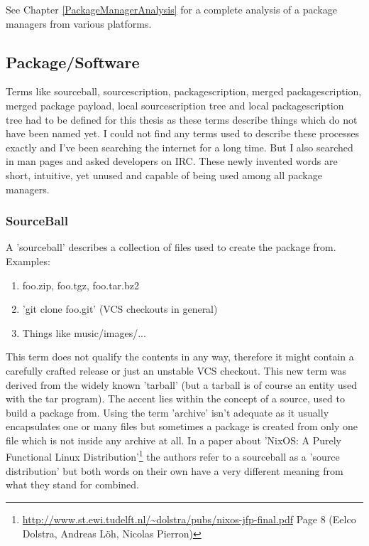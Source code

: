 \documentclass[a4paper,10pt]{article}
\begin{document}
See Chapter \ref{PackageManagerAnalysis} for a complete analysis of a package managers from various platforms.





\subsection{Package/Software}
\label{newterms}
Terms like sourceball, sourcescription, packagescription, merged packagescription, merged package payload, local sourcescription tree and local packagescription tree had to be defined for this thesis as these terms describe things which do not have been named yet. I could not find any terms used to describe these processes exactly and I've been searching the internet for a long time. But I also searched in man pages and asked developers on IRC. These newly invented words are short, intuitive, yet unused and capable of being used among all package managers.\\

\subsubsection*{SourceBall}
A 'sourceball' describes a collection of files used to create the package from. Examples:
\begin{enumerate}
 \item foo.zip, foo.tgz, foo.tar.bz2
 \item 'git clone foo.git' (VCS checkouts in general)
 \item Things like music/images/...
\end{enumerate}
This term does not qualify the contents in any way, therefore it might contain a carefully crafted release or just an unstable VCS checkout. This new term was derived from the widely known 'tarball' (but a tarball is of course an entity used with the tar program). The accent lies within the concept of a source, used to build a package from. Using the term 'archive' isn't adequate as it usually encapsulates one or many files but sometimes a package is created from only one file which is not inside any archive at all. In a paper about 'NixOS: A Purely Functional Linux Distribution'\footnote{\url{http://www.st.ewi.tudelft.nl/~dolstra/pubs/nixos-jfp-final.pdf} Page 8 (Eelco Dolstra, Andreas L\"oh, Nicolas Pierron)} the authors refer to a sourceball as a 'source distribution' but both words on their own have a very different meaning from what they stand for combined.
\end{document}
